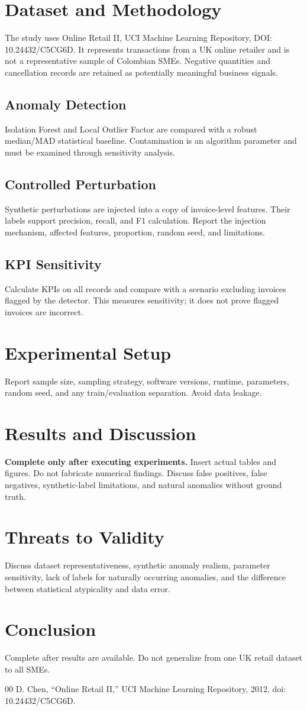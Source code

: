 \documentclass[conference]{IEEEtran}
\begin{document}
\section{Dataset and Methodology}
The study uses Online Retail II, UCI Machine Learning Repository, DOI: 10.24432/C5CG6D. It represents transactions from a UK online retailer and is not a representative sample of Colombian SMEs. Negative quantities and cancellation records are retained as potentially meaningful business signals.
\subsection{Anomaly Detection}
Isolation Forest and Local Outlier Factor are compared with a robust median/MAD statistical baseline. Contamination is an algorithm parameter and must be examined through sensitivity analysis.
\subsection{Controlled Perturbation}
Synthetic perturbations are injected into a copy of invoice-level features. Their labels support precision, recall, and F1 calculation. Report the injection mechanism, affected features, proportion, random seed, and limitations.
\subsection{KPI Sensitivity}
Calculate KPIs on all records and compare with a scenario excluding invoices flagged by the detector. This measures sensitivity; it does not prove flagged invoices are incorrect.
\section{Experimental Setup}
Report sample size, sampling strategy, software versions, runtime, parameters, random seed, and any train/evaluation separation. Avoid data leakage.
\section{Results and Discussion}
\textbf{Complete only after executing experiments.} Insert actual tables and figures. Do not fabricate numerical findings. Discuss false positives, false negatives, synthetic-label limitations, and natural anomalies without ground truth.
\section{Threats to Validity}
Discuss dataset representativeness, synthetic anomaly realism, parameter sensitivity, lack of labels for naturally occurring anomalies, and the difference between statistical atypicality and data error.
\section{Conclusion}
Complete after results are available. Do not generalize from one UK retail dataset to all SMEs.
\begin{thebibliography}{00}
 D. Chen, ``Online Retail II,'' UCI Machine Learning Repository, 2012, doi: 10.24432/C5CG6D.
\end{thebibliography}
\end{document}
